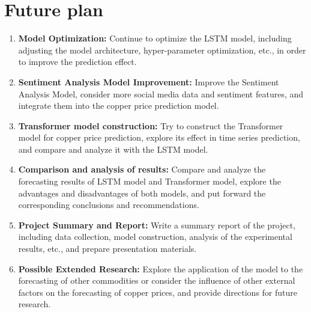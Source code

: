 \documentclass[project-plan]{report-template}
\begin{document}
\section{Future plan}
\begin{enumerate}
    \item \textbf{Model Optimization:} Continue to optimize the LSTM model, including adjusting the model architecture, hyper-parameter optimization, etc., in order to improve the prediction effect.
    
    \item \textbf{Sentiment Analysis Model Improvement:} Improve the Sentiment Analysis Model, consider more social media data and sentiment features, and integrate them into the copper price prediction model.
    
    \item \textbf{Transformer model construction:} Try to construct the Transformer model for copper price prediction, explore its effect in time series prediction, and compare and analyze it with the LSTM model.
    
    \item \textbf{Comparison and analysis of results:} Compare and analyze the forecasting results of LSTM model and Transformer model, explore the advantages and disadvantages of both models, and put forward the corresponding conclusions and recommendations.
    
    \item \textbf{Project Summary and Report:} Write a summary report of the project, including data collection, model construction, analysis of the experimental results, etc., and prepare presentation materials.
    
    \item \textbf{Possible Extended Research:} Explore the application of the model to the forecasting of other commodities or consider the influence of other external factors on the forecasting of copper prices, and provide directions for future research.
\end{enumerate}


\end{document}
